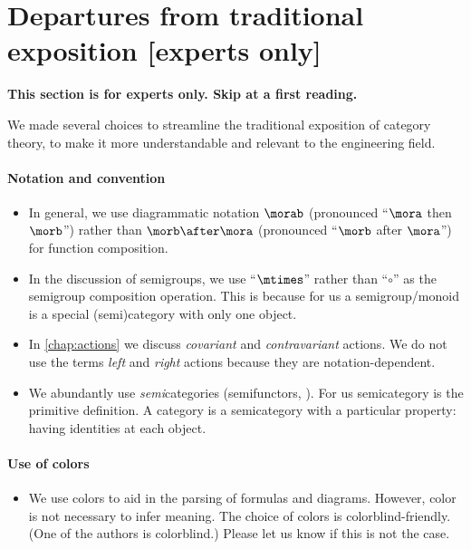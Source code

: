 
\section[Departures from tradition]{Departures from traditional exposition [experts only]}

\textbf{This section is for experts only.
    Skip at a first reading.
}

We made several choices to streamline the traditional exposition of category theory, to make it more understandable and relevant to the engineering field.

\paragraph{Notation and convention}
\begin{itemize}
    \item In general, we use diagrammatic notation $\morab$ (pronounced ``$\mora$ then $\morb$'') rather than $\morb \after \mora$ (pronounced ``$\morb$ after $\mora$'') for function composition.
    \item In the discussion of semigroups, we use ``$\mtimes$'' rather than ``$\circ$'' as the semigroup composition operation.
          This is because for us a semigroup/monoid is a special (semi)category with only one object.
    \item In \cref{chap:actions} we discuss \emph{covariant} and \emph{contravariant} actions.
          We do not use the terms \emph{left} and \emph{right} actions because they are notation-dependent.
    \item We abundantly use \emph{semi}categories (semifunctors, \etc).
          For us semicategory is the primitive definition.
          A category is a semicategory with a particular property: having identities at each object.
\end{itemize}

\paragraph{Use of colors}
\begin{itemize}
    \item We use colors to aid in the parsing of formulas and diagrams.
          However, color is not necessary to infer meaning.
          The choice of colors is colorblind-friendly.
          (One of the authors is colorblind.)
          Please let us know if this is not the case.
\end{itemize}

